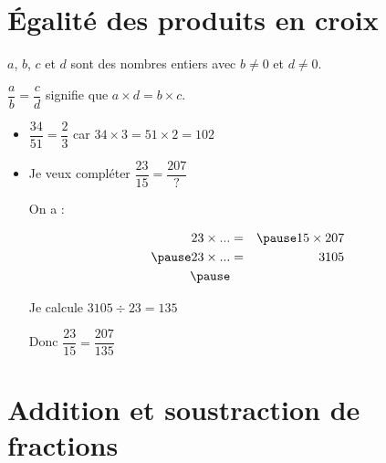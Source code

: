 \documentclass[xcolor={dvipsnames}]{beamer}
\begin{document}
\section{\'Egalité des produits en croix}

\begin{frame}
	\begin{myprop}
		$a$, $b$, $c$ et $d$  sont des nombres entiers \pause avec $b \neq 0$ et $ d \neq 0$.\pause
		
		$\dfrac{a}{b} = \dfrac{c}{d}$ signifie que \pause $a \times d = b \times c$.\pause
		
		
	\end{myprop}
	
	
	\begin{myexs}
		\begin{itemize}
			\item $\dfrac{34}{51} = \dfrac{2}{3}$ \pause car $34 \times 3 = 51 \times 2 = 102$ \pause
			
			\item Je veux compléter $\dfrac{23}{15} = \dfrac{207}{?}$ \pause
			
			On a :\pause
			
			\vspace*{-1cm}
			\begin{eqnarray*}
				23 \times ... &=& \pause 15 \times 207 \\ \pause
				23 \times ... &=& \num{3105} \\ \pause
			\end{eqnarray*}
			\vspace*{-1cm}
			
			Je calcule $\num{3105} \div 23 = 135$ \pause
			
			Donc $\dfrac{23}{15} = \dfrac{207}{135}$ 
		\end{itemize}
		
	\end{myexs}
\end{frame}

\section{Addition et soustraction de fractions}
\end{document}
